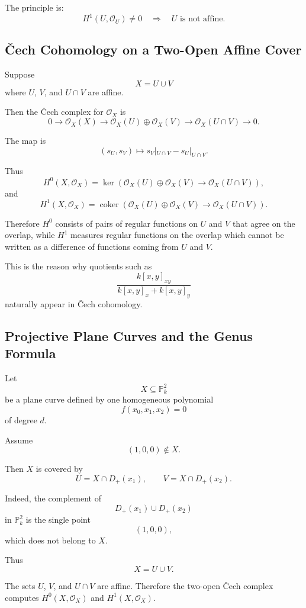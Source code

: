 The principle is:
\[
\boxed{
	H^1(U,\mathcal O_U)\neq0
	\quad\Longrightarrow\quad
	U\text{ is not affine}.
}
\]

\subsection{\v{C}ech Cohomology on a Two-Open Affine Cover}

Suppose
\[
X=U\cup V
\]
where $U$, $V$, and $U\cap V$ are affine.

Then the \v{C}ech complex for $\mathcal O_X$ is
\[
0
\longrightarrow
\mathcal O_X(X)
\longrightarrow
\mathcal O_X(U)\oplus\mathcal O_X(V)
\longrightarrow
\mathcal O_X(U\cap V)
\longrightarrow 0.
\]

The map is
\[
(s_U,s_V)
\longmapsto
s_V|_{U\cap V}-s_U|_{U\cap V}.
\]

Thus
\[
H^0(X,\mathcal O_X)
=
\ker\left(
\mathcal O_X(U)\oplus\mathcal O_X(V)
\to
\mathcal O_X(U\cap V)
\right),
\]
and
\[
H^1(X,\mathcal O_X)
=
\operatorname{coker}\left(
\mathcal O_X(U)\oplus\mathcal O_X(V)
\to
\mathcal O_X(U\cap V)
\right).
\]

Therefore $H^0$ consists of pairs of regular functions on $U$ and $V$ that
agree on the overlap, while $H^1$ measures regular functions on the overlap
which cannot be written as a difference of functions coming from $U$ and $V$.

This is the reason why quotients such as
\[
\frac{k[x,y]_{xy}}{k[x,y]_x+k[x,y]_y}
\]
naturally appear in \v{C}ech cohomology.

\subsection{Projective Plane Curves and the Genus Formula}

Let
\[
X\subseteq \mathbb P_k^2
\]
be a plane curve defined by one homogeneous polynomial
\[
f(x_0,x_1,x_2)=0
\]
of degree $d$.

Assume
\[
(1,0,0)\notin X.
\]

Then $X$ is covered by
\[
U=X\cap D_+(x_1),
\qquad
V=X\cap D_+(x_2).
\]

Indeed, the complement of
\[
D_+(x_1)\cup D_+(x_2)
\]
in $\mathbb P_k^2$ is the single point
\[
(1,0,0),
\]
which does not belong to $X$.

Thus
\[
X=U\cup V.
\]

The sets $U$, $V$, and $U\cap V$ are affine. Therefore the two-open
\v{C}ech complex computes $H^0(X,\mathcal O_X)$ and
$H^1(X,\mathcal O_X)$.

